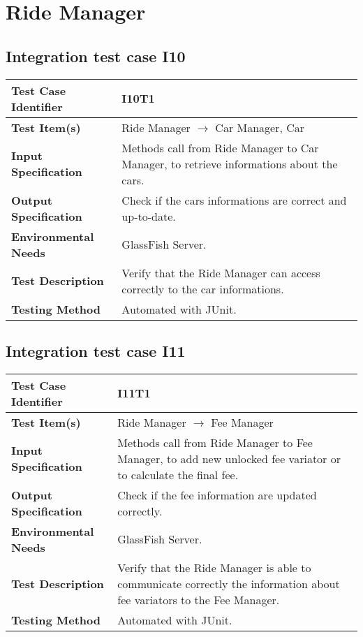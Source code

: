 \section{Ride Manager}
\subsection{Integration test case I10}

\begin{tabular}{l p{}}
    \hline
    \textbf{Test Case Identifier} & I10T1\\
    \hline
    \textbf{Test Item(s)} & Ride Manager $\rightarrow$ Car Manager, Car\\
    \hline
    \textbf{Input Specification} & Methods call from Ride Manager to Car Manager, to retrieve informations about the cars.\\
    \hline
    \textbf{Output Specification} & Check if the cars informations are correct and up-to-date.\\
    \hline
    \textbf{Environmental Needs} & GlassFish Server. \\
    \hline
    \textbf{Test Description} & Verify that the Ride Manager can access correctly to the car informations.\\
    \hline
    \textbf{Testing Method} & Automated with JUnit.\\
    \hline
\end{tabular}

\subsection{Integration test case I11}

\begin{tabular}{l p{}}
    \hline
    \textbf{Test Case Identifier} & I11T1\\
    \hline
    \textbf{Test Item(s)} & Ride Manager $\rightarrow$ Fee Manager\\
    \hline
    \textbf{Input Specification} & Methods call from Ride Manager to Fee Manager, to add new unlocked fee variator or to calculate the final fee.\\
    \hline
    \textbf{Output Specification} & Check if the fee information are updated correctly.\\
    \hline
    \textbf{Environmental Needs} & GlassFish Server. \\
    \hline
    \textbf{Test Description} & Verify that the Ride Manager is able to communicate correctly the information about fee variators to the Fee Manager.\\
    \hline
    \textbf{Testing Method} & Automated with JUnit.\\
    \hline
\end{tabular}